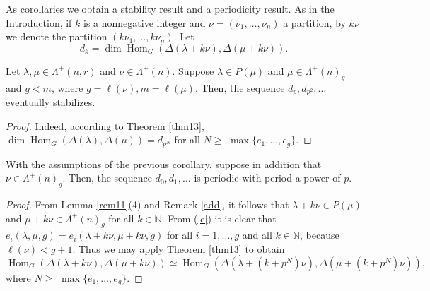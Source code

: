 \documentclass[ALCO,Unicode]{cedram}
\newcommand{\la}{\lambda}
\newcommand{\La}{\Lambda}
\DeclareMathOperator{\Hom}{Hom}
\numberwithin{equation}{section}
\begin{document}
	As corollaries we obtain a stability result and a periodicity result. As in the Introduction, if $k$ is a nonnegative integer and $\nu=(\nu_1,\dots,\nu_n)$ a partition, by $k\nu$ we denote the partition $(k\nu_1,\dots,k\nu_n).$ Let \begin{equation}\label{defdk}d_k=\dim \Hom _{G}(\Delta (\lambda + k \nu), \Delta(\mu + k \nu)).\end{equation}
	
\begin{coro}\label{stab} Let $\la, \mu \in \La^{+}(n,r)$ and $\nu \in \La^{+}(n)$. Suppose $\la \in P(\mu)$ and  $\mu \in \La^{+}(n)_g$ and $g<m$, where $g=\ell(\nu), m=\ell(\mu)$. Then, the sequence $d_{p}, d_{p^2}, \dots$ 
eventually stabilizes.
\end{coro}
\begin{proof} Indeed, according to Theorem \ref{thm13}, $\dim \Hom_{G}(\Delta (\lambda), \Delta(\mu)) = d_{p^N}$ for all $N \ge $ $\max\{e_1,\dots,e_g\}.$
\end{proof}		
\begin{coro}\label{per} With the assumptions of the previous corollary, suppose in addition that $\nu \in \La^{+}(n)_g$. Then, the sequence $d_0, d_1, \dots$ 
	is periodic with period a power of $p$.
\end{coro}
\begin{proof} From Lemma \ref{rem11}(4) and Remark \ref{add}, it follows that $\lambda + k \nu \in P(\mu)$ and $\mu + k \nu \in \Lambda^{+}(n)_g$ for all $k \in \mathbb{N}$. From  (\ref{e}) it is clear that $e_{i}(\lambda, \mu, g) = e_{i}(\lambda + k\nu, \mu + k\nu, g)$ for all $i=1,\dots,g$ and all $k \in \mathbb{N}$, because  $\ell(\nu) < g+1$. Thus we may apply Theorem \ref{thm13} to obtain \[\Hom_{G}(\Delta (\lambda + k \nu), \Delta(\mu + k \nu)) \simeq \Hom_{G}(\Delta (\lambda + (k+p^N) \nu), \Delta(\mu + (k+p^N) \nu)),\] where $N \ge $ $\max\{e_1,\dots,e_g\}.$
\end{proof}		
\end{document}
